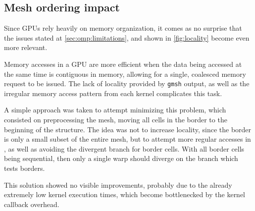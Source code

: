 \subsection{Mesh ordering impact}
\label{subsec:cuda:ordering}


Since GPUs rely heavily on memory organization, it comes as no surprise that the issues stated at \cref{sec:omp:limitations}, and shown in \cref{fig:locality} become even more relevant.

Memory accesses in a GPU are more efficient when the data being accessed at the same time is contiguous in memory, allowing for a single, coalesced memory request to be issued. The lack of locality provided by \texttt{gmsh} output, as well as the irregular memory access pattern from each kernel complicates this task.

A simple approach was taken to attempt minimizing this problem, which consisted on preprocessing the mesh, moving all cells in the border to the beginning of the structure.
The idea was not to increase locality, since the border is only a small subset of the entire mesh, but to attempt more regular accesses in \computeflux, as well as avoiding the divergent branch for border cells.
With all border cells being sequential, then only a single warp should diverge on the branch which tests borders.

This solution showed no visible improvements, probably due to the already extremely low kernel execution times, which become bottlenecked by the kernel callback overhead. 
